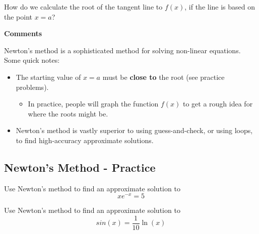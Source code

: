 
\vfill

\newpage

How do we calculate the root of the tangent line to $f(x)$, if the
line is based on the point $x=a$?

\vfill
\vfill
\vfill


\newpage


{\bf Comments} 

Newton's method is a sophisticated method for solving non-linear
equations. Some quick notes:
\begin{itemize}
\item The starting value of $x=a$ must be {\bf close to} the root (see
  practice problems).
  \begin{itemize}
  \item In practice, people will graph the function $f(x)$ to get a
    rough idea for where the roots might be. 
  \end{itemize}
\item Newton's method is vastly superior to using guess-and-check, or
  using loops, to find high-accuracy approximate solutions.
\end{itemize}

\newpage
{}
\subsection*{Newton's Method - Practice}

\problem Use Newton's method to find an approximate solution to
$$x e^{-x} = 5$$

\newpage
\problem Use Newton's method to find an approximate solution to  $$sin(x) = \frac{1}{10}\ln(x)$$




